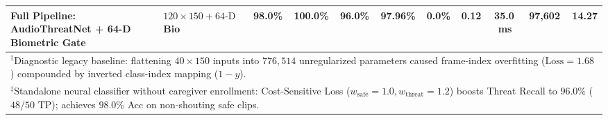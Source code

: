 \begin{table}[htbp]
{\begin{tabular}{llccccccccr}
\textbf{Full Pipeline: AudioThreatNet + 64-D Biometric Gate} & $120\times 150 + 64\text{-D}$ Bio & \textbf{98.0\%} & \textbf{100.0\%} & \textbf{96.0\%} & \textbf{97.96\%} & \textbf{0.0\%} & \textbf{0.12} & 35.0\,ms & 97,602 & 14.27 \\
\bottomrule
\multicolumn{11}{l}{\footnotesize $^{\dagger}$Diagnostic legacy baseline: flattening $40\times 150$ inputs into $776{,}514$ unregularized parameters caused frame-index overfitting ($\text{Loss}=1.68$) compounded by inverted class-index mapping ($1-y$).} \\
\multicolumn{11}{l}{\footnotesize $^{\ddagger}$Standalone neural classifier without caregiver enrollment: Cost-Sensitive Loss ($w_{\text{safe}}=1.0, w_{\text{threat}}=1.2$) boosts Threat Recall to $96.0\%$ ($48/50\text{ TP}$); achieves $98.0\%$ Acc on non-shouting safe clips.}
\end{tabular}
}
\end{table}
